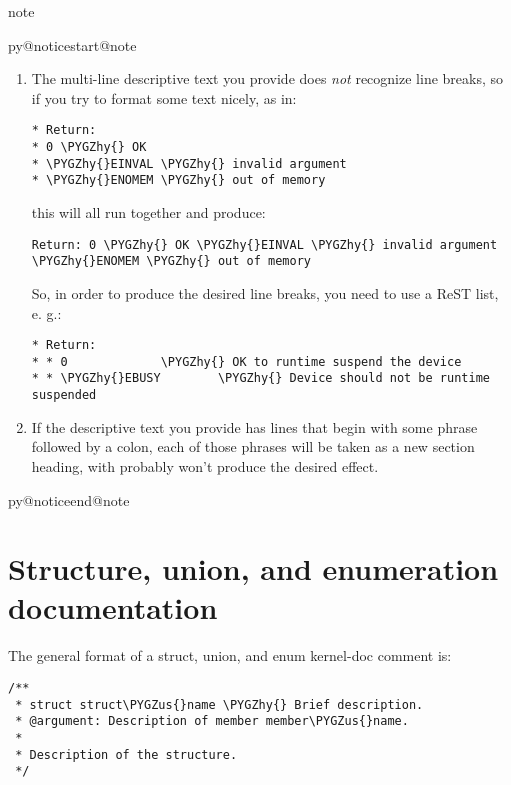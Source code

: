 \documentclass[a4paper,8pt,english]{sphinxmanual}
\makeatletter
\renewenvironment{notice}[2]{%
          \def\py@noticetype{#1}
          \begin{coloredbox}{#1}
          \bf\it
          \par\strong{#2}
          \csname py@noticestart@#1\endcsname
        }
	{
          \csname py@noticeend@\py@noticetype\endcsname
          \end{coloredbox}
        }
\def\PYGZus{\char`\_}
\def\PYGZhy{\char`\-}
\makeatother
\begin{document}
\begin{notice}{note}{Note:}\begin{enumerate}
\item {} 
The multi-line descriptive text you provide does \emph{not} recognize
line breaks, so if you try to format some text nicely, as in:

\begin{Verbatim}[commandchars=\\\{\}]
* Return:
* 0 \PYGZhy{} OK
* \PYGZhy{}EINVAL \PYGZhy{} invalid argument
* \PYGZhy{}ENOMEM \PYGZhy{} out of memory
\end{Verbatim}

this will all run together and produce:

\begin{Verbatim}[commandchars=\\\{\}]
Return: 0 \PYGZhy{} OK \PYGZhy{}EINVAL \PYGZhy{} invalid argument \PYGZhy{}ENOMEM \PYGZhy{} out of memory
\end{Verbatim}

So, in order to produce the desired line breaks, you need to use a
ReST list, e. g.:

\begin{Verbatim}[commandchars=\\\{\}]
* Return:
* * 0             \PYGZhy{} OK to runtime suspend the device
* * \PYGZhy{}EBUSY        \PYGZhy{} Device should not be runtime suspended
\end{Verbatim}

\item {} 
If the descriptive text you provide has lines that begin with
some phrase followed by a colon, each of those phrases will be taken
as a new section heading, with probably won't produce the desired
effect.

\end{enumerate}
\end{notice}


\section{Structure, union, and enumeration documentation}
\label{doc-guide/kernel-doc:structure-union-and-enumeration-documentation}
The general format of a struct, union, and enum kernel-doc comment is:

\begin{Verbatim}[commandchars=\\\{\}]
/**
 * struct struct\PYGZus{}name \PYGZhy{} Brief description.
 * @argument: Description of member member\PYGZus{}name.
 *
 * Description of the structure.
 */
\end{Verbatim}
\end{document}
